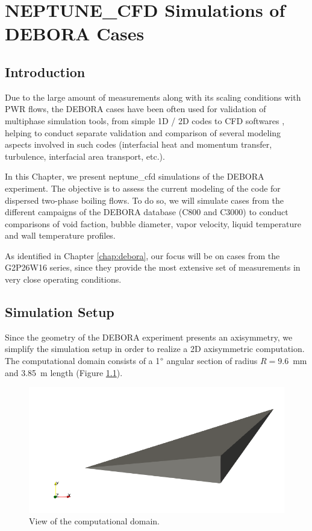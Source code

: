 \chapter{NEPTUNE\_CFD Simulations of DEBORA Cases}
\label{chap:debora_ncfd}

\minitoc

\section{Introduction}

Due to the large amount of measurements along with its scaling conditions with PWR flows, the DEBORA cases have been often used for validation of multiphase simulation tools, from simple 1D / 2D codes \cite{kledy_DEBORA, gueguen_contribution_2013, manon_contribution_2000} to CFD softwares \cite{mimouni_debora, guelfi_neptune, bestion_debora, baglietto_debora, montout}, helping to conduct separate validation and comparison of several modeling aspects involved in such codes (interfacial heat and momentum transfer, turbulence, interfacial area transport, etc.). 

\npar

In this Chapter, we present neptune\_cfd simulations of the DEBORA experiment. The objective is to assess the current modeling of the code for dispersed two-phase boiling flows. To do so, we will simulate cases from the different campaigns of the DEBORA database (C800 and C3000) to conduct comparisons of void faction, bubble diameter, vapor velocity, liquid temperature and wall temperature profiles.

\npar

As identified in Chapter \ref{chap:debora}, our focus will be on cases from the G2P26W16 series, since they provide the most extensive set of measurements in very close operating conditions.


\section{Simulation Setup}

Since the geometry of the DEBORA experiment presents an axisymmetry, we simplify the simulation setup in order to realize a 2D axisymmetric computation. The computational domain consists of a 1$\degree$ angular section of radius $R=9.6$\ mm and 3.85\ m length (Figure \ref{fig:deb_cfd_domain}).


\begin{figure}[!h]
\centering
\includegraphics[width=0.6\linewidth]{img/DEBORA/cfd/msh/domain.png}
\caption{View of the computational domain.}
\label{fig:deb_cfd_domain}
\end{figure}



